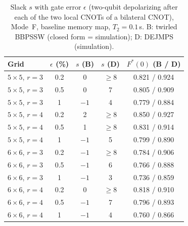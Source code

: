 \begin{table}[t]
\centering
\caption{Slack $s$ with gate error $\epsilon$ (two-qubit depolarizing after each of the two local CNOTs of a bilateral CNOT), Mode~F, baseline memory map, $T_2=0.1$\,s. B: twirled BBPSSW (closed form = simulation); D: DEJMPS (simulation).}
\label{tab:desgate}
\footnotesize
\setlength{\tabcolsep}{4pt}
\begin{tabular}{lcccc}
\toprule
Grid & $\epsilon$ (\%) & $s$ (B) & $s$ (D) & $F^*(0)$ (B / D)\\
\midrule
$5\times5$, $r=3$ & 0.2 & 0 & $\ge$8 & 0.821 / 0.924\\
$5\times5$, $r=3$ & 0.5 & 0 & 7 & 0.805 / 0.909\\
$5\times5$, $r=3$ & 1 & $-1$ & 4 & 0.779 / 0.884\\
$5\times5$, $r=4$ & 0.2 & 2 & $\ge$8 & 0.850 / 0.927\\
$5\times5$, $r=4$ & 0.5 & 1 & $\ge$8 & 0.831 / 0.914\\
$5\times5$, $r=4$ & 1 & $-1$ & 5 & 0.799 / 0.890\\
$6\times6$, $r=3$ & 0.2 & $-1$ & $\ge$8 & 0.784 / 0.906\\
$6\times6$, $r=3$ & 0.5 & $-1$ & 6 & 0.766 / 0.888\\
$6\times6$, $r=3$ & 1 & $-1$ & 3 & 0.736 / 0.859\\
$6\times6$, $r=4$ & 0.2 & 0 & $\ge$8 & 0.818 / 0.910\\
$6\times6$, $r=4$ & 0.5 & $-1$ & 7 & 0.796 / 0.893\\
$6\times6$, $r=4$ & 1 & $-1$ & 4 & 0.760 / 0.866\\
\bottomrule
\end{tabular}
\end{table}

